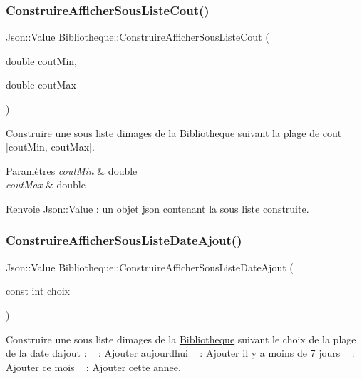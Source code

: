 \subsubsection{\texorpdfstring{Construire\+Afficher\+Sous\+Liste\+Cout()}{ConstruireAfficherSousListeCout()}\hspace{0.1cm}{\footnotesize\ttfamily [2/2]}}
{\footnotesize\ttfamily Json\+::\+Value Bibliotheque\+::\+Construire\+Afficher\+Sous\+Liste\+Cout (\begin{DoxyParamCaption}\item[{double}]{cout\+Min,  }\item[{double}]{cout\+Max }\end{DoxyParamCaption})}



Construire une sous liste d\textquotesingle{}images de la \hyperlink{classBibliotheque}{Bibliotheque} suivant la plage de cout \mbox{[}cout\+Min, cout\+Max\mbox{]}. 


\begin{DoxyParams}{Paramètres}
{\em cout\+Min} & double \\
\hline
{\em cout\+Max} & double \\
\hline
\end{DoxyParams}
\begin{DoxyReturn}{Renvoie}
Json\+::\+Value \+: un objet json contenant la sous liste construite. 
\end{DoxyReturn}
\mbox{\label{classBibliotheque_a6b50b88a3f8f402052649e1bdc495b9a}} 
\subsubsection{\texorpdfstring{Construire\+Afficher\+Sous\+Liste\+Date\+Ajout()}{ConstruireAfficherSousListeDateAjout()}}
{\footnotesize\ttfamily Json\+::\+Value Bibliotheque\+::\+Construire\+Afficher\+Sous\+Liste\+Date\+Ajout (\begin{DoxyParamCaption}\item[{const int}]{choix }\end{DoxyParamCaption})}



Construire une sous liste d\textquotesingle{}images de la \hyperlink{classBibliotheque}{Bibliotheque} suivant le choix de la plage de la date d\textquotesingle{}ajout \+: ~ \+: Ajouter aujourd\textquotesingle{}hui ~ \+: Ajouter il y a moins de 7 jours ~ \+: Ajouter ce mois ~ \+: Ajouter cette annee. 


